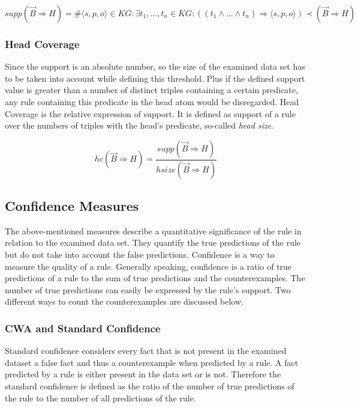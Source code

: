 $$
supp(\vec{B} \Rightarrow H) = \# \langle s,p,o \rangle \in KG : \exists t_{1},...,t_{n} \in KG : ((t_{1}\land ...\land t_{n}) \Rightarrow \langle s,p,o \rangle) \prec (\vec{B} \Rightarrow H)
$$

\subsubsection{Head Coverage}

Since the support is an absolute number, so the size of the examined data set has to be taken into account while defining this threshold. Plus if the defined support value is greater than a number of distinct triples containing a certain predicate, any rule containing this predicate in the head atom would be disregarded. Head Coverage is the relative expression of support. It is defined as support of a rule over the numbers of triples with the head's predicate, so-called \textit{head size}.

$$ hc(\vec{B} \Rightarrow H) = \frac{supp(\vec{B} \Rightarrow H)}{hsize(\vec{B} \Rightarrow H)}  $$

\subsection{Confidence Measures}

The above-mentioned measures describe a quantitative significance of the rule in relation to the examined data set. They quantify the true predictions of the rule but do not take into account the false predictions. Confidence is a way to measure the quality of a rule. Generally speaking, confidence is a ratio of true predictions of a rule to the sum of true predictions and the counterexamples. The number of true predictions can easily be expressed by the rule's support. Two different ways to count the counterexamples are discussed below.

\subsubsection{CWA and Standard Confidence}

Standard confidence considers every fact that is not present in the examined dataset a false fact and thus a counterexample when predicted by a rule. A fact predicted by a rule is either present in the data set or is not. Therefore the standard confidence is defined as the ratio of the number of true predictions of the rule to the number of all predictions of the rule.

